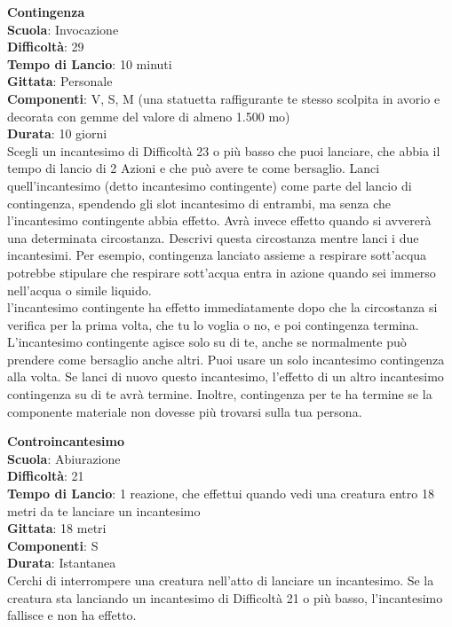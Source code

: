 \begin{multicols}{2}
\medskip\textbf{Contingenza}\\
\textbf{Scuola}: Invocazione\\
\textbf{Difficoltà}: 29\\
\textbf{Tempo di Lancio}: 10 minuti\\
\textbf{Gittata}: Personale\\
\textbf{Componenti}: V, S, M (una statuetta raffigurante te stesso scolpita in avorio e decorata con gemme del valore di almeno 1.500 mo)\\
\textbf{Durata}: 10 giorni\\
Scegli un incantesimo di Difficoltà 23 o più basso che puoi lanciare, che abbia il tempo di lancio di 2 Azioni e che può avere te come bersaglio. Lanci quell'incantesimo (detto incantesimo contingente) come parte del lancio di contingenza, spendendo gli slot incantesimo di entrambi, ma senza che l'incantesimo contingente abbia effetto. Avrà invece effetto quando si avvererà una determinata circostanza. Descrivi questa circostanza mentre lanci i due incantesimi. Per esempio, contingenza lanciato assieme a respirare sott'acqua potrebbe stipulare che respirare sott'acqua entra in azione quando sei immerso nell'acqua o simile liquido.\\
l'incantesimo contingente ha effetto immediatamente dopo che la circostanza si verifica per la prima volta, che tu lo voglia o no, e poi contingenza termina. L'incantesimo contingente agisce solo su di te, anche se normalmente può prendere come bersaglio anche altri. Puoi usare un solo incantesimo contingenza alla volta. Se lanci di nuovo questo incantesimo, l'effetto di un altro incantesimo contingenza su di te avrà termine. Inoltre, contingenza per te ha termine se la componente materiale non dovesse più trovarsi sulla tua persona.


\medskip\textbf{Controincantesimo}\\
\textbf{Scuola}: Abiurazione\\
\textbf{Difficoltà}: 21\\
\textbf{Tempo di Lancio}: 1 reazione, che effettui quando vedi una creatura entro 18 metri da te lanciare un incantesimo\\
\textbf{Gittata}: 18 metri\\
\textbf{Componenti}: S \\
\textbf{Durata}: Istantanea\\
Cerchi di interrompere una creatura nell'atto di lanciare un incantesimo. Se la creatura sta lanciando un incantesimo di Difficoltà 21 o più basso, l'incantesimo fallisce e non ha effetto. 



\end{multicols}
